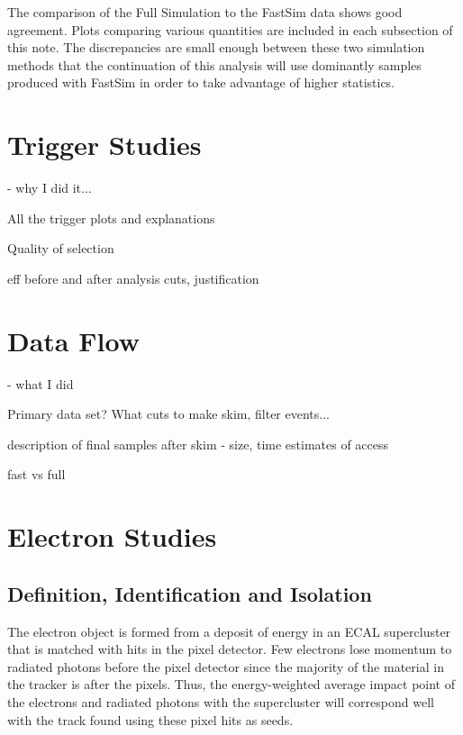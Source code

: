 \documentclass{cmspaper}
\begin{document}

The comparison of the Full Simulation to the FastSim data shows good agreement.  Plots comparing various quantities are included in each subsection of this note.  The discrepancies are small enough between these two simulation methods that the continuation of this analysis will use dominantly samples produced with FastSim in order to take advantage of higher statistics.

\section{Trigger Studies} - why I did it...

All the trigger plots and explanations

Quality of selection

eff before and after analysis cuts, justification


\section{Data Flow} - what I did

Primary data set?  What cuts to make skim, filter events...

description of final samples after skim - size, time estimates of access



fast vs full

\section{Electron Studies}

\subsection{Definition, Identification and Isolation}

The electron object is formed from a deposit of energy in an ECAL supercluster that is matched with hits in the pixel detector.  Few electrons lose momentum to radiated photons before the pixel detector since the majority of the material in the tracker is after the pixels.  Thus, the energy-weighted average impact point of the electrons and radiated photons with the supercluster will correspond well with the track found using these pixel hits as seeds.  
\end{document}
